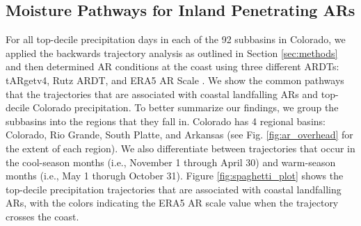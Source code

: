 \documentclass[draft]{agujournal2019}
\begin{document}
\subsection{Moisture Pathways for Inland Penetrating ARs}
\label{sec:results:moisture_pathways}
%

For all top-decile precipitation days in each of the 92 subbasins in Colorado, we applied the backwards trajectory analysis as outlined in Section \ref{sec:methods} and then determined AR conditions at the coast using three different ARDTs: tARgetv4, Rutz ARDT, and ERA5 AR Scale \cite{MartinRalph2019, Rutz2014, Guan2024AERA5}. We show the common pathways that the trajectories that are associated with coastal landfalling ARs and top-decile Colorado precipitation. To better summarize our findings, we group the subbasins into the regions that they fall in. Colorado has 4 regional basins: Colorado, Rio Grande, South Platte, and Arkansas (see Fig. \ref{fig:ar_overhead} for the extent of each region). We also differentiate between trajectories that occur in the cool-season months (i.e., November 1 through April 30) and warm-season months (i.e., May 1 thorugh October 31). Figure \ref{fig:spaghetti_plot} shows the top-decile precipitation trajectories that are associated with coastal landfalling ARs, with the colors indicating the ERA5 AR scale value when the trajectory crosses the coast. 
\end{document}
